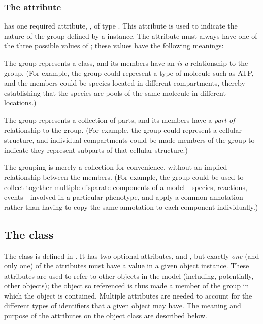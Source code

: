 \subsubsection{The \fixttspace{} attribute}
\label{kind-attribute}

\Group has one required attribute, , of type .  This attribute is used to indicate the nature of the group defined by a \Group instance.  The  attribute must always have one of the three possible values of ; these values have the following meanings:

\begin{description}[font=\normalfont\ttfamily\color{black},style=nextline]

\item[\token{classification}] The group represents a class, and its members have an \emph{is-a} relationship to the group.  (For example, the group could represent a type of molecule such as ATP, and the members could be species located in different compartments, thereby establishing that the species are pools of the same molecule in different locations.)

\item[\token{partonomy}] The group represents a collection of parts, and its members have a \emph{part-of} relationship to the group.  (For example, the group could represent a cellular structure, and individual compartments could be made members of the group to indicate they represent subparts of that cellular structure.)

\item[\token{collection}] The grouping is merely a collection for convenience, without an implied relationship between the members.  (For example, the group could be used to collect together multiple disparate components of a model---species, reactions, events---involved in a particular phenotype, and apply a common annotation rather than having to copy the same annotation to each component individually.)

\end{description}


\subsection{The  class}
\label{member-class}

The \Member class is defined in .  It has two optional attributes,  and , but exactly \emph{one} (and only one) of the attributes must have a value in a given \Member object instance.  These attributes are used to refer to other objects in the model (including, potentially, other \Group objects); the object so referenced is thus made a member of the group in which the \Member object is contained.  Multiple attributes are needed to account for the different types of identifiers that a given object may have.  The meaning and purpose of the attributes on the object class are described below.

